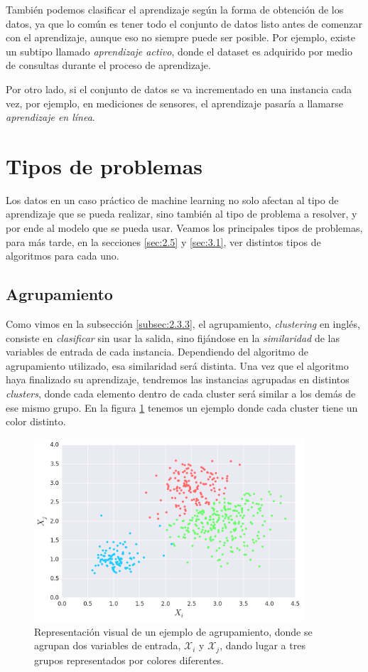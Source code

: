 También podemos clasificar el aprendizaje según la forma de obtención de los datos, ya que lo común es tener todo el conjunto de datos listo antes de comenzar con el aprendizaje, aunque eso no siempre puede ser posible. Por ejemplo, existe un subtipo llamado \emph{aprendizaje activo}, donde el dataset es adquirido por medio de consultas durante el proceso de aprendizaje.

Por otro lado, si el conjunto de datos se va incrementado en una instancia cada vez, por ejemplo, en mediciones de sensores, el aprendizaje pasaría a llamarse \emph{aprendizaje en línea}.

\section{Tipos de problemas} \label{sec:2.4}

Los datos en un caso práctico de machine learning no solo afectan al tipo de aprendizaje que se pueda realizar, sino también al tipo de problema a resolver, y por ende al modelo que se pueda usar. Veamos los principales tipos de problemas, para más tarde, en la secciones \ref{sec:2.5} y \ref{sec:3.1}, ver distintos tipos de algoritmos para cada uno. 

\subsection{Agrupamiento} \label{subsec:2.4.1}

Como vimos en la subsección \ref{subsec:2.3.3}, el agrupamiento, \emph{clustering} en inglés, consiste en \emph{clasificar} sin usar la salida, sino fijándose en la \emph{similaridad} de las variables de entrada de cada instancia. Dependiendo del algoritmo de agrupamiento utilizado, esa similaridad será distinta. Una vez que el algoritmo haya finalizado su aprendizaje, tendremos las instancias agrupadas en distintos \emph{clusters}, donde cada elemento dentro de cada cluster será similar a los demás de ese mismo grupo. En la figura \ref{fig:2.2} tenemos un ejemplo donde cada cluster tiene un color distinto.

\begin{figure}[ht]
  \centering
  \includegraphics[width=100mm]{figures/ch_02/clustering_example.png}
  \caption{Representación visual de un ejemplo de agrupamiento, donde se agrupan dos variables de entrada, $\mathcal{X}_{i}$ y $\mathcal{X}_{j}$, dando lugar a tres grupos representados por colores diferentes.}
  \label{fig:2.2}
\end{figure}

